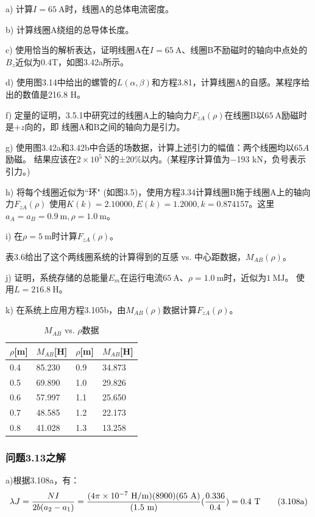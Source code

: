 a) 计算$I =65\ \mathrm{A}$时，线圈A的总体电流密度。

b) 计算线圈A绕组的总导体长度。

c) 使用恰当的解析表达，证明线圈A在$I =65\ \mathrm{A}$、线圈B不励磁时的轴向中点处的$B_z$近似为0.4T，如图3.42a所示。

d) 使用图3.14中给出的螺管的$L(\alpha,\beta)$和方程3.81，计算线圈A的自感。某程序给出的数值是216.8 H。

f) 定量的证明，3.5.1中研究过的线圈A上的轴向力$F_{zA}(\rho)$在线圈B以$65\ \mathrm{A}$励磁时是$+z$向的，即
线圈A和B之间的轴向力是引力。

g) 使用图3.42a和3.42b中合适的场数据，计算上述引力的幅值：两个线圈均以$65A$励磁。
结果应该在$2\times 10^5\ \mathrm{N}$的±20\%以内。(某程序计算值为−193 kN，负号表示引力。)

h) 将每个线圈近似为``环" (如图3.5)，使用方程3.34计算线圈B施于线圈A上的轴向力$F_{zA}(\rho)$
使用$K(k) =2.10000,E(k)=1.2000,k=0.874157$。这里$a_A=a_B=0.9 \ \mathrm{m},\rho=1.0\ \mathrm{m}$。

i) 在$\rho=5\ \mathrm{m}$时计算$F_{zA}(\rho)$。

表3.6给出了这个两线圈系统的计算得到的互感 vs. 中心距数据，$M_{AB}(\rho)$。

j) 证明，系统存储的总能量$E_m$在运行电流$65\ \mathrm{A}$、$\rho=1.0\ \mathrm{m}$时，近似为$1\ \mathrm{MJ}$。
使用$L=216.8\ \mathrm{H}$。

k) 在系统上应用方程3.105b，由$M_{AB}(\rho)$数据计算$F_{zA}(\rho)$。

\begin{table}[htbp]\small
\centering
\caption{$M_{AB}$ vs. $\rho$数据}
	\begin{tabular}{|l|l|l|l|}
		\hline
		$\rho${[}m{]} & $M_{AB}${[}H{]} & $\rho${[}m{]} & $M_{AB}${[}H{]} \\ \hline
		0.4     & 85.230     & 0.9     & 34.873     \\ \hline
		0.5     & 69.890     & 1.0     & 29.826     \\ \hline
		0.6     & 57.997     & 1.1     & 25.650     \\ \hline
		0.7     & 48.585     & 1.2     & 22.173     \\ \hline
		0.8     & 41.028     & 1.3     & 13.258     \\ \hline
	\end{tabular}
\end{table}


\subsubsection{问题3.13之解}
a)根据3.108a，有：
\begin{equation*}
\lambda J=\frac{NI}{2b(a_{2}-a_{1})}\\%
=\frac{(4\pi\times 10^{-7}\ \mathrm{H/m})(8900)(65\ \mathrm{A})}{(1.5\ \mathrm{m})}(\frac{0.336}{0.4})=0.4\ \mathrm{T}\tag{3.108a}
\end{equation*}


